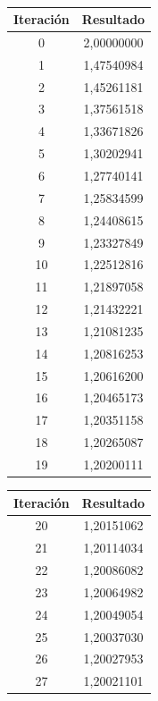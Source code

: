 \documentclass[titlepage,a4paper]{article}
\begin{document}
\\
\begin{multicols}{2}
\begin{center}
    \begin{tabular}{| c | c |}
    \hline
     Iteración & Resultado \\ \hline
        0     & 2,00000000 \\
        1     & 1,47540984 \\
        2     & 1,45261181 \\
        3     & 1,37561518 \\
        4     & 1,33671826 \\
        5     & 1,30202941 \\
        6     & 1,27740141 \\
        7     & 1,25834599 \\
        8     & 1,24408615 \\
        9     & 1,23327849 \\
        10    & 1,22512816 \\
        11    & 1,21897058 \\
        12    & 1,21432221 \\
        13    & 1,21081235 \\
        14    & 1,20816253 \\
        15    & 1,20616200 \\
        16    & 1,20465173 \\
        17    & 1,20351158 \\
        18    & 1,20265087 \\
        19    & 1,20200111 \\
            \hline
    \end{tabular}
\end{center}
        \begin{center}
    \begin{tabular}{| c | c |}
    \hline
     Iteración & Resultado \\ \hline
        20    & 1,20151062 \\
        21    & 1,20114034 \\
        22    & 1,20086082 \\
        23    & 1,20064982 \\
        24    & 1,20049054 \\
        25    & 1,20037030 \\
        26    & 1,20027953 \\
        27    & 1,20021101 \\

\end{tabular}
\end{center}
\end{multicols}
\end{document}
